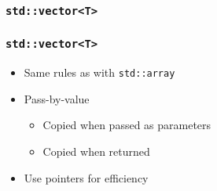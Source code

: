 \documentclass{../ucll-slides}
\begin{document}
\begin{frame}
  \frametitle{\tt std::vector<T>}
\end{frame}

\begin{frame}
  \frametitle{\tt std::vector<T>}
  \begin{itemize}
    \item Same rules as with {\tt std::array}
    \item Pass-by-value
          \begin{itemize}
            \item Copied when passed as parameters \cake
            \item Copied when returned \cake
          \end{itemize}
    \item Use pointers for efficiency
  \end{itemize}
\end{frame}
\end{document}
